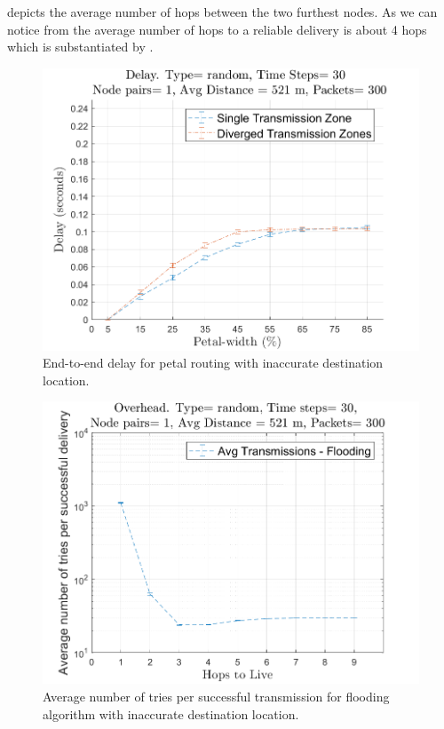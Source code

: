  depicts the average number of hops between the two furthest nodes. As we can notice from  the average number of hops to a reliable delivery is about 4 hops which is substantiated by .

\begin{figure}[hbtp]
\centering
\includegraphics[width=\simResultFigSize\textwidth]{ncsuthesis-0.6/Chapter-5/figs/mob_pe_delay_random.png}
\caption{End-to-end delay for petal routing with inaccurate destination location.}
\label{fig:mob_pe_delay_random}
\end{figure}


\begin{figure}[hbtp]
\centering
\includegraphics[width=\simResultFigSize\textwidth]{ncsuthesis-0.6/Chapter-5/figs/mob_fl_trans_random.png}
\caption{Average number of tries per successful transmission for flooding algorithm with inaccurate destination location.}
\label{fig:mob_fl_trans_random}
\end{figure}

